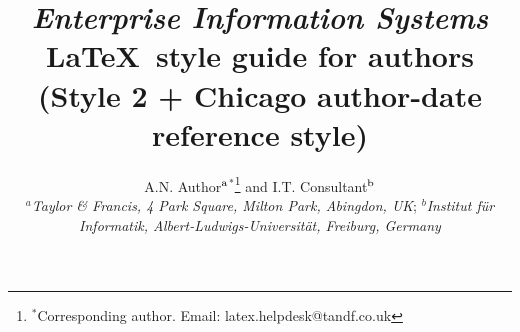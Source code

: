 \documentclass[]{tEIS2e}
\theoremstyle{plain}
\theoremstyle{remark}
\begin{document}


\title{{\itshape Enterprise Information Systems} \LaTeX\ style guide
for authors \break (Style 2 + Chicago author-date reference style)}

\author{A.N. Author$^{\rm a}$$^{\ast}$\thanks{$^\ast$Corresponding author. Email: latex.helpdesk@tandf.co.uk
\vspace{6pt}} and I.T. Consultant$^{\rm b}$\\\vspace{6pt}  $^{a}${\em{Taylor \& Francis, 4 Park Square, Milton Park, Abingdon, UK}};
$^{b}${\em{Institut f\"{u}r Informatik, Albert-Ludwigs-Universit\"{a}t, Freiburg,
Germany}}\\ }

\maketitle
\end{document}
